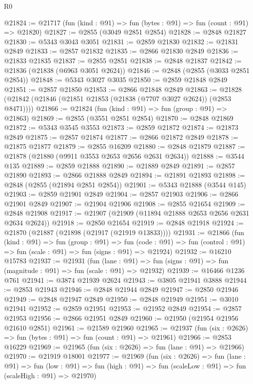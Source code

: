 \begin{lexlean}{R0}
\begin{coremodule}
@21824 := @21717 (fun (kind : @91) => fun (bytes : @91) => fun (count : @91) => @21820)
@21827 := @2855 (@3049 @2851 @2854)
@21828 := @2848 @21827
@21830 := @5343 @3043 @3051
@21831 := @2859 @21830
@21832 := @21831 @2849
@21833 := @2857 @21832
@21835 := @2866 @21830 @2849
@21836 := @21833 @21835
@21837 := @2855 @2851
@21838 := @2848 @21837
@21842 := @21836 (@21838 (@6963 @3051 @2624))
@21846 := @2848 (@2855 (@3033 @2851 @2854))
@21848 := @5343 @3027 @3035
@21850 := @2859 @21848 @2849
@21851 := @2857 @21850
@21853 := @2866 @21848 @2849
@21863 := @21828 (@21842 (@21846 (@21851 @21853 (@21838 (@7707 @3027 @2624)) (@2853 @8471))))
@21866 := @21824 (fun (kind : @91) => fun (group : @91) => @21863)
@21869 := @2855 (@3551 @2851 @2854)
@21870 := @2848 @21869
@21872 := @5343 @3545 @3553
@21873 := @2859 @21872
@21874 := @21873 @2849
@21875 := @2857 @21874
@21877 := @2866 @21872 @2849
@21878 := @21875 @21877
@21879 := @2855 @16209
@21880 := @2848 @21879
@21887 := @21878 (@21880 (@9911 @3553 @2653 @2656 @2631 @2634))
@21888 := @3544 @135
@21889 := @2859 @21888
@21890 := @21889 @2849
@21891 := @2857 @21890
@21893 := @2866 @21888 @2849
@21894 := @21891 @21893
@21898 := @2848 (@2855 (@21894 @2851 @2854))
@21901 := @5343 @21888 (@3544 @145)
@21903 := @2859 @21901 @2849
@21904 := @2857 @21903
@21906 := @2866 @21901 @2849
@21907 := @21904 @21906
@21908 := @2855 @21654
@21909 := @2848 @21908
@21917 := @21907 (@21909 (@11894 @21888 @2653 @2656 @2631 @2634 @2624))
@21918 := @2850 @21654
@21919 := @2848 @21918
@21924 := @21870 (@21887 (@21898 (@21917 (@21919 @13833))))
@21931 := @21866
    (fun (kind : @91) =>
    fun (group : @91) =>
    fun (code : @91) => fun (control : @91) => fun (scale : @91) => fun (signs : @91) => @21924)
@21932 := @16210 @15783
@21937 := @21931
    (fun (lane : @91) => fun (signs : @91) => fun (magnitude : @91) => fun (scale : @91) => @21932)
@21939 := @16466 @1236 @761
@21941 := @3874 @21939 @2624
@21943 := @3805 @21941 @3888
@21944 := @2853 @21943
@21946 := @2848 @21944 @2849
@21947 := @2850 @21946
@21949 := @2848 @21947 @2849
@21950 := @2848 @21949
@21951 := @3010 @21941
@21952 := @2859 @21951
@21953 := @21952 @2849
@21954 := @2857 @21953
@21956 := @2866 @21951 @2849
@21960 := @21950 (@21954 @21956 @21610 @2851)
@21961 := @21589 @21960
@21965 := @21937 (fun (six : @2626) => fun (bytes : @91) => fun (count : @91) => @21961)
@21966 := @2853 @16229
@21969 := @21965 (fun (six : @2626) => fun (lane : @91) => @21966)
@21970 := @21919 @18001
@21977 := @21969
    (fun (six : @2626) =>
    fun (lane : @91) =>
    fun (low : @91) => fun (high : @91) => fun (scaleLow : @91) => fun (scaleHigh : @91) => @21970)

\end{coremodule}
\end{lexlean}
